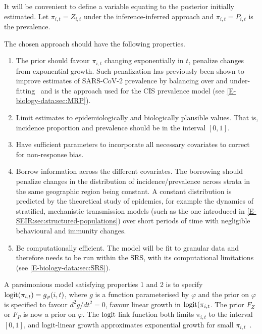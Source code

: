 \documentclass[thesis.tex]{subfiles}
\begin{document}
It will be convenient to define a variable equating to the posterior initially estimated.
Let $\pi_{i,t} = Z_{i,t}$ under the inference-inferred approach and $\pi_{i,t} = P_{i,t}$ is the prevalence.

The chosen approach should have the following properties.
\begin{enumerate}
    \item The prior should favour $\pi_{i,t}$ changing exponentially in $t$, \ie penalize changes from exponential growth.
        Such penalization has previously been shown to improve estimates of SARS-CoV-2 prevalence by balancing over and under-fitting~\autocite{ealesAppropriately} and is the approach used for the CIS prevalence model (see \cref{E-biology-data:sec:MRP}).
    \item Limit estimates to epidemiologically and biologically plausible values.
        That is, incidence proportion and prevalence should be in the interval $[0, 1]$.
    \item Have sufficient parameters to incorporate all necessary covariates to correct for non-response bias.
    \item Borrow information across the different covariates.
        The borrowing should penalize changes in the distribution of incidence/prevalence across strata in the same geographic region being constant.
        A constant distribution is predicted by the theoretical study of epidemics, for example the dynamics of stratified, mechanistic transmission models (such as the one introduced in \cref{E-SEIR:sec:structured-populations}) over short periods of time with negligible behavioural and immunity changes.
    \item Be computationally efficient.
        The model will be fit to granular data and therefore needs to be run within the SRS, with its computational limitations (see \cref{E-biology-data:sec:SRS}).
\end{enumerate}

A parsimonious model satisfying properties 1 and 2 is to specify $\operatorname{logit}(\pi_{i,t}) = g_\varphi(i, t)$, where $g$ is a function parameterised by $\varphi$ and the prior on $\varphi$ is specified to favour $d^2g/dt^2 = 0$, \ie favour linear growth in $\operatorname{logit}(\pi_{i,t}$.
The prior $F_Z$ or $F_P$ is now a prior on $\varphi$.
The $\operatorname{logit}$ link function both limits $\pi_{i,t}$ to the interval $[0, 1]$, and logit-linear growth approximates exponential growth for small $\pi_{i,t}$~\autocite{ealesAppropriately}.
\end{document}
